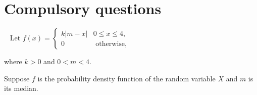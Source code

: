 \documentclass[letterpaper,10pt,addpoints]{exam}
\begin{document}
\section{Compulsory questions}
\begin{questions}
\question[20]~
Let $f(x)=\left\{\begin{array}{cl}k|m-x| & 0 \leq x \leq 4, \\ 0 & \text { otherwise, }\end{array}\right.$

where $k>0$ and $0<m<4$.

Suppose $f$ is the probability density function of the random variable $X$ and $m$ is its median. 





\end{questions}
\end{document}
